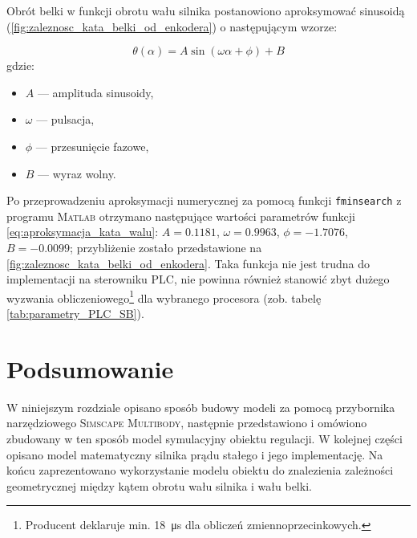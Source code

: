 Obrót belki w funkcji obrotu wału silnika postanowiono aproksymować sinusoidą (\cref{fig:zaleznosc_kata_belki_od_enkodera}) o następującym wzorze:

\begin{equation}\label{eq:aproksymacja_kata_walu}
    \theta(\alpha) = A \sin (\omega \alpha + \phi) + B
\end{equation}
gdzie:
\begin{itemize}
    \item $A$ --- amplituda sinusoidy,
    \item $\omega$ --- pulsacja,
    \item $\phi$ --- przesunięcie fazowe,
    \item $B$ --- wyraz wolny.
\end{itemize}

Po przeprowadzeniu aproksymacji numerycznej za pomocą funkcji \texttt{fminsearch} z programu \textsc{Matlab} otrzymano następujące wartości parametrów funkcji \eqref{eq:aproksymacja_kata_walu}: $A = \num{0.1181}$, $\omega = \num{0.9963}$, $\phi = \num{-1.7076}$, $B = \num{-0.0099}$; przybliżenie zostało przedstawione na \cref{fig:zaleznosc_kata_belki_od_enkodera}. Taka funkcja nie jest trudna do implementacji na sterowniku PLC, nie powinna również stanowić zbyt dużego wyzwania obliczeniowego\footnote{Producent deklaruje min. \SI{18}{\micro\second} dla obliczeń zmiennoprzecinkowych.} dla wybranego procesora (zob. tabelę \ref{tab:parametry_PLC_SB}).

\section{Podsumowanie}

W niniejszym rozdziale opisano sposób budowy modeli za pomocą przybornika narzędziowego \textsc{Simscape Multibody}, następnie przedstawiono i omówiono zbudowany w ten sposób model symulacyjny obiektu regulacji. W kolejnej części opisano model matematyczny silnika prądu stałego i jego implementację. Na końcu zaprezentowano wykorzystanie modelu obiektu do znalezienia zależności geometrycznej między kątem obrotu wału silnika i wału belki.


